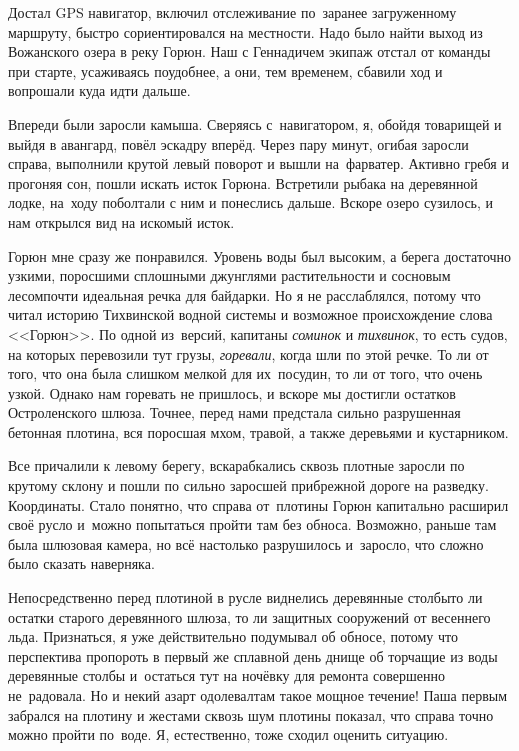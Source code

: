 Достал GPS навигатор, включил отслеживание по~заранее загруженному маршруту, быстро сориентировался на местности. Надо было найти выход из Вожанского озера в реку Горюн. Наш с Геннадичем экипаж отстал от команды при старте, усаживаясь поудобнее, а они, тем временем, сбавили ход и вопрошали куда идти дальше. 

Впереди были заросли камыша. Сверяясь с~навигатором, я, обойдя товарищей и выйдя в авангард, повёл эскадру вперёд. Через пару минут, огибая заросли справа, выполнили крутой левый поворот и вышли на~фарватер. Активно гребя и прогоняя сон, пошли искать исток Горюна. Встретили рыбака на деревянной лодке, на~ходу поболтали с ним и понеслись дальше. Вскоре озеро сузилось, и нам открылся вид на искомый исток.

Горюн мне сразу же понравился. Уровень воды был высоким, а берега достаточно узкими, поросшими сплошными джунглями растительности и сосновым лесом\mdash почти идеальная речка для байдарки. Но я не расслаблялся, потому что читал историю Тихвинской водной системы и возможное происхождение слова <<Горюн>>. По одной из~версий, капитаны \textit{соминок} и \textit{тихвинок}, то есть судов, на которых перевозили тут грузы, \textit{горевали}, когда шли по этой речке. То ли от того, что она была слишком мелкой для их~посудин, то ли от того, что очень узкой. Однако нам горевать не пришлось, и вскоре мы достигли остатков Остроленского шлюза. Точнее, перед нами предстала сильно разрушенная бетонная плотина, вся поросшая мхом, травой, а также деревьями и кустарником.  

Все причалили к левому берегу, вскарабкались сквозь плотные заросли по крутому склону и пошли по сильно заросшей прибрежной дороге на разведку. Координаты\mdash \CoordsGorunSixteenPlotina. Стало понятно, что справа от~плотины Горюн капитально расширил своё русло и~можно попытаться пройти там без обноса. Возможно, раньше там была шлюзовая камера, но всё настолько разрушилось и~заросло, что сложно было сказать наверняка. 

Непосредственно перед плотиной в русле виднелись деревянные столбы\mdash то ли остатки старого деревянного шлюза, то ли защитных сооружений от весеннего льда. Признаться, я уже действительно подумывал об обносе, потому что перспектива пропороть в первый же сплавной день днище об торчащие из воды деревянные столбы и~остаться тут на ночёвку для ремонта совершенно не~радовала. Но и некий азарт одолевал\mdash там такое мощное течение! Паша первым забрался на плотину и жестами сквозь шум плотины показал, что справа точно можно пройти по~воде. Я, естественно, тоже сходил оценить ситуацию. 

